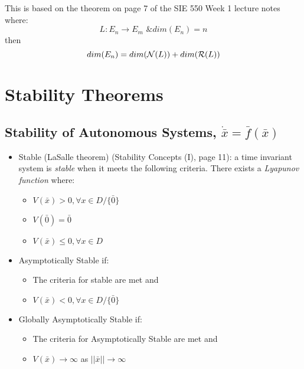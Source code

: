 \documentclass[12pt]{article}
\begin{document}
This is based on the theorem on page 7 of the SIE 550 Week 1 lecture notes where:
$$L:E_n \rightarrow E_m \text{ \& } dim(E_n)=n$$
then 
$$dim(E_n)=dim({\cal N}(L))+dim({\cal R}(L))$$

\newpage
\section*{Stability Theorems}
\subsection*{Stability of Autonomous Systems, $\dot{\bar{x}}=\bar{f}(\bar{x})$}
\begin{itemize}
\item Stable (LaSalle theorem) (Stability Concepts (I), page 11): a time invariant system is {\em stable} when it meets the following criteria. There exists a {\em Lyapunov function} where:
	\begin{itemize}
	\item $V(\bar{x})>0, \forall x \in D/\{\bar{0}\}$
	\item $V(\bar{0})=\bar{0}$
	\item $V(\bar{x})\leq0, \forall x \in D$
	\end{itemize}
\item Asymptotically Stable if:
	\begin{itemize}
	\item The criteria for stable are met and
	\item $V(\bar{x})<0, \forall x \in D/\{\bar{0}\}$
	\end{itemize}
\item Globally Asymptotically Stable if:
	\begin{itemize}
	\item The criteria for Asymptotically Stable are met and
	\item $V(\bar{x})\to\infty$ as $||\bar{x}||\to\infty$
	\end{itemize}
\end{itemize}

\newpage
\end{document}
